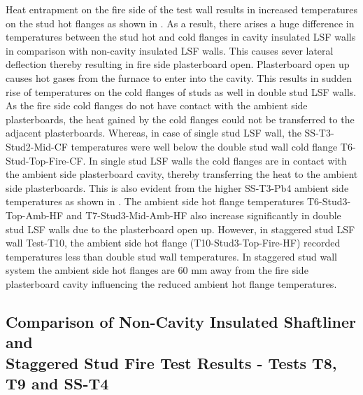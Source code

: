 Heat entrapment on the fire side of the test wall results in increased temperatures on the stud hot flanges as shown in . As a result, there arises a huge difference in temperatures between the stud hot and cold flanges in cavity insulated LSF walls in comparison with non-cavity insulated LSF walls. This causes sever lateral deflection thereby resulting in fire side plasterboard open. Plasterboard open up causes hot gases from the furnace to enter into the cavity. This results in sudden rise of temperatures on the cold flanges of studs as well in double stud LSF walls. As the fire side cold flanges do not have contact with the ambient side plasterboards, the heat gained by the cold flanges could not be transferred to the adjacent plasterboards. Whereas, in case of single stud LSF wall, the SS-T3-Stud2-Mid-CF temperatures were well below the double stud wall cold flange T6-Stud-Top-Fire-CF. In single stud LSF walls the cold flanges are in contact with the ambient side plasterboard cavity, thereby transferring the heat to the ambient side plasterboards. This is also evident from the higher SS-T3-Pb4 ambient side temperatures as shown in . The ambient side hot flange temperatures T6-Stud3-Top-Amb-HF and T7-Stud3-Mid-Amb-HF also increase significantly in double stud LSF walls due to the plasterboard open up. However, in staggered stud LSF wall Test-T10, the ambient side hot flange (T10-Stud3-Top-Fire-HF) recorded temperatures less than double stud wall temperatures. In staggered stud wall system the ambient side hot flanges are 60 mm away from the fire side plasterboard cavity influencing the reduced ambient hot flange temperatures.      

\subsection{Comparison of Non-Cavity Insulated Shaftliner and\\Staggered Stud Fire Test Results - Tests T8, T9 and SS-T4}

